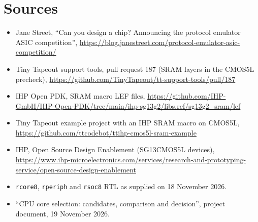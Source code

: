 \documentclass[10pt,a4paper]{article}
\begin{document}
\section*{Sources}
{\small
\begin{itemize}
\item Jane Street, ``Can you design a chip? Announcing the protocol emulator ASIC competition'',
\url{https://blog.janestreet.com/protocol-emulator-asic-competition/}
\item Tiny Tapeout support tools, pull request 187 (SRAM layers in the CMOS5L precheck),
\url{https://github.com/TinyTapeout/tt-support-tools/pull/187}
\item IHP Open PDK, SRAM macro LEF files,
\url{https://github.com/IHP-GmbH/IHP-Open-PDK/tree/main/ihp-sg13g2/libs.ref/sg13g2_sram/lef}
\item Tiny Tapeout example project with an IHP SRAM macro on CMOS5L,
\url{https://github.com/ttcodebot/ttihp-cmos5l-sram-example}
\item IHP, Open Source Design Enablement (SG13CMOS5L devices),
\url{https://www.ihp-microelectronics.com/services/research-and-prototyping-service/open-source-design-enablement}
\item \texttt{rcore8}, \texttt{rperiph} and \texttt{rsoc8} RTL as supplied on 18 November 2026.
\item ``CPU core selection: candidates, comparison and decision'', project document, 19 November 2026.
\end{itemize}}
\end{document}
